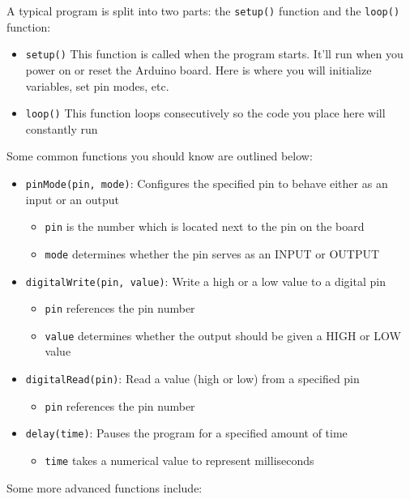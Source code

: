 \documentclass{article}
\begin{document}
A typical program is split into two parts: the \texttt{setup()} function and the \texttt{loop()} function:
\begin{itemize}
    \item \texttt{setup()} This function is called when the program starts. It’ll run when you power on or reset the Arduino board. Here is where you will initialize variables, set pin modes, etc. 
    \item \texttt{loop()} This function loops consecutively so the code you place here will constantly run
\end{itemize}
Some common functions you should know are outlined below:
\begin{itemize}
    \item \texttt{pinMode(pin, mode)}: Configures the specified pin to behave either as an input or an output
    \begin{itemize}
        \item \texttt{pin} is the number which is located next to the pin on the board
        \item \texttt{mode} determines whether the pin serves as an INPUT or OUTPUT
    \end{itemize}
    \item \texttt{digitalWrite(pin, value)}: Write a high or a low value to a digital pin
    \begin{itemize}
        \item \texttt{pin} references the pin number
        \item \texttt{value} determines whether the output should be given a HIGH or LOW value
    \end{itemize}
    \item \texttt{digitalRead(pin)}: Read a value (high or low) from a specified pin
    \begin{itemize}
        \item \texttt{pin} references the pin number
    \end{itemize}
    \item \texttt{delay(time)}: Pauses the program for a specified amount of time
    \begin{itemize}
        \item \texttt{time} takes a numerical value to represent milliseconds
    \end{itemize}
\end{itemize}
Some more advanced functions include:
\end{document}
